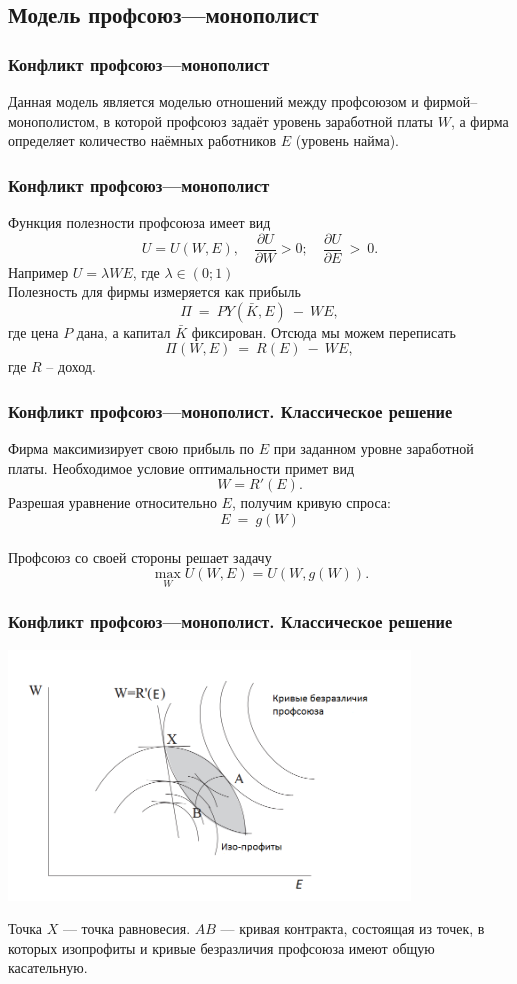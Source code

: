 \documentclass {beamer}
\begin{document}
\begin{frame}
\section{Модель профсоюз---монополист}
\frametitle{Конфликт профсоюз---монополист}
Данная модель является моделью отношений между профсоюзом и фирмой--монополистом, 
в которой профсоюз задаёт уровень заработной платы $W$, а фирма определяет 
количество наёмных работников $E$ (уровень найма).

\end{frame}

\begin{frame}
\frametitle{Конфликт профсоюз---монополист}
Функция полезности профсоюза имеет вид 
$$ U = U(W,E), \quad \frac{\partial U}{\partial W} > 0; \quad \frac{\partial U}{\partial E}~>~0.$$ 
Например $U = \lambda WE$, где $\lambda \in (0; 1)$\\
Полезность для фирмы измеряется как прибыль 
$$\Pi~=~PY(\bar K,E)~-~WE,$$ 
где цена $P$ дана, а капитал $\bar K$ фиксирован. Отсюда мы можем переписать 
$$\Pi(W,E)~=~R(E)~-~WE,$$ 
где $R$ -- доход.
\end{frame}

\begin{frame}
\frametitle{Конфликт профсоюз---монополист. Классическое решение}
	
	Фирма максимизирует свою прибыль по $E$ при заданном уровне заработной платы. 
	Необходимое условие оптимальности примет вид
	$$ W = R'(E).$$
	Разрешая уравнение относительно $E$, получим кривую спроса: $$E~=~g(W)$$\\
	Профсоюз со своей стороны решает задачу
	$$ \max_W U(W,E) = U(W,g(W)). $$
\end{frame}


\begin{frame}
\frametitle{Конфликт профсоюз---монополист. Классическое решение}

 \begin{center}
 	\includegraphics[width=0.8\textwidth]{monopoly_union}
 \end{center}
 Точка $X$ --- точка равновесия.  $AB$ --- кривая контракта, состоящая из
 точек, в которых изопрофиты и кривые безразличия профсоюза имеют общую касательную.
\end{frame}
\end{document}

